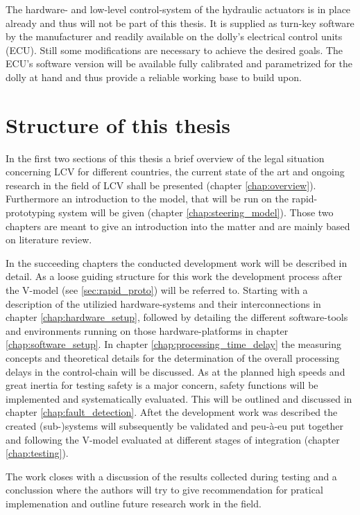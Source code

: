 \documentclass[ExampleMasters.tex]{subfiles}
\begin{document}
The hardware- and low-level control-system of the hydraulic actuators is in place already and thus will not be part of this thesis. It is supplied as turn-key software by the manufacturer and readily available on the dolly's electrical control units (ECU). Still some modifications are necessary to achieve the desired goals. The ECU's software version will be available fully calibrated and parametrized for the dolly at hand and thus provide a reliable working base to build upon. 


\section{Structure of this thesis}
\label{sec:structure}

In the first two sections of this thesis a brief overview of the legal situation concerning LCV for different countries, the current state of the art and ongoing research in the field of LCV shall be presented (chapter \ref{chap:overview}). Furthermore an introduction to the model, that will be run on the rapid-prototyping system will be given (chapter \ref{chap:steering_model}). Those two chapters are meant to give an introduction into the matter and are mainly based on literature review. 

In the succeeding chapters the conducted development work will be described in detail. As a loose guiding structure for this work the development process after the V-model (see \ref{sec:rapid_proto}) will be referred to. Starting with a description of the utilizied hardware-systems and their interconnections in chapter \ref{chap:hardware_setup}, followed by detailing the different software-tools and environments running on those hardware-platforms in chapter \ref{chap:software_setup}. In chapter \ref{chap:processing_time_delay} the measuring concepts and theoretical details for the determination of the overall processing delays in the control-chain will be discussed. As at the planned high speeds and great inertia for testing safety is a major concern, safety functions will be implemented and systematically evaluated. This will be outlined and discussed in chapter \ref{chap:fault_detection}. Aftet the development work was described the created (sub-)systems will subsequently be validated and peu-\`{a}-eu put together and following the V-model evaluated at different stages of integration (chapter \ref{chap:testing}). 

The work closes with a discussion of the results collected during testing and a conclussion where the authors will try to give recommendation for pratical implemenation and outline future research work in the field.
\end{document}
